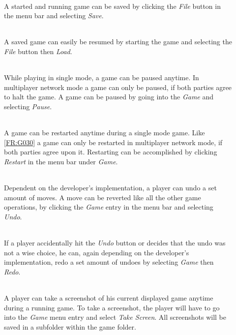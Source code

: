 \vspace{.5cm}

\begin{description}
   \item[] \textbf{} \\
   A started and running game can be saved by clicking the \emph{File} button in the menu bar and selecting \emph{Save}.
  \item[] \textbf{} \\
  A saved game can easily be resumed by starting the game and selecting the \emph{File} button then \emph{Load}.
\item[] \textbf{} \\
While playing in single mode, a game can be paused anytime. In multiplayer network mode a game can only be paused, if both parties agree to halt the game. A game can be paused by going into the \emph{Game} and selecting \emph{Pause}.
\item[] \textbf{} \\
A game can be restarted anytime during a single mode game. Like \ref{FR:G030} a game can only be restarted in multiplayer network mode, if both parties agree upon it. Restarting can be accomplished by clicking \emph{Restart} in the menu bar under \emph{Game}.
\item[] \textbf{} \\
Dependent on the developer's implementation, a \gls{player} can undo a set amount of moves. A move can be reverted like all the other game operations, by clicking the \emph{Game} entry in the menu bar and selecting \emph{Undo}.
\item[] \textbf{} \\
If a player accidentally hit the \emph{Undo} button or decides that the undo was not a wise choice, he can, again depending on the developer's implementation, redo a set amount of undoes by selecting \emph{Game} then \emph{Redo}.
\item[] \textbf{} \\
A player can take a screenshot of his current displayed game anytime during a running game. To take a screenshot, the player will have to go into the \emph{Game} menu entry and select \emph{Take Screen}. All screenshots will be saved in a subfolder within the game folder.
\end{description}

